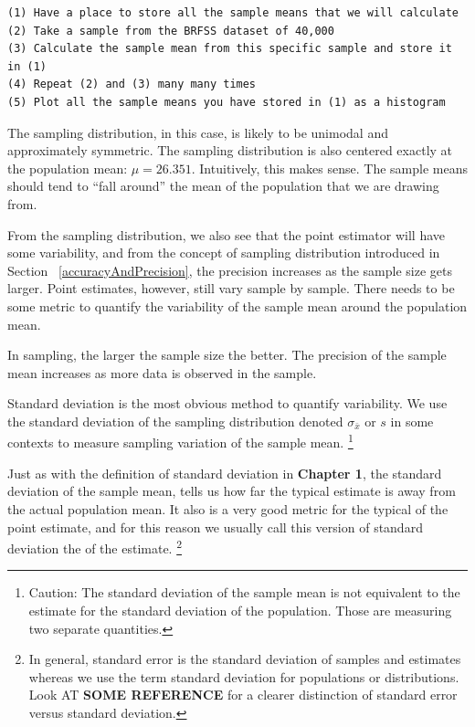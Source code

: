 \begin{verbatim}
(1) Have a place to store all the sample means that we will calculate
(2) Take a sample from the BRFSS dataset of 40,000
(3) Calculate the sample mean from this specific sample and store it in (1)
(4) Repeat (2) and (3) many many times 
(5) Plot all the sample means you have stored in (1) as a histogram
\end{verbatim}
  
The sampling distribution, in this case, is likely to be unimodal and approximately symmetric. The sampling distribution is also centered exactly at the  population mean: $\mu=26.351$. Intuitively, this makes sense. The sample means should tend to ``fall around'' the mean of the population that we are drawing from.

From the sampling distribution, we also see that the point estimator will have some variability, and from the concept of sampling distribution introduced in Section ~\ref{accuracyAndPrecision}, the precision increases as the sample size gets larger. Point estimates, however, still vary sample by sample. There needs to be some metric to quantify the variability of the sample mean around the population mean.

\begin{tipBox}{
In sampling, the larger the sample size the better. The precision of the sample mean increases as more data is observed in the sample.}
\end{tipBox}

Standard deviation is the most obvious method to quantify variability. We use the standard deviation of the sampling distribution denoted  $\sigma_{\bar{x}}$ or $s$ in some contexts to measure sampling variation of the sample mean. \footnote{Caution: The standard deviation of the sample mean is not equivalent to the estimate for the standard deviation of the population. Those are measuring two separate quantities.}

Just as with the definition of standard deviation in \textbf{Chapter 1}, the standard deviation of the sample mean, tells us how far the typical estimate is away from the actual population mean. It also is a very good metric for the typical  of the point estimate, and for this reason we usually call this version of standard deviation the   of the estimate. \footnote{In general, standard error is the standard deviation of samples and estimates whereas we use the term standard deviation for populations or distributions. Look AT \textbf{SOME REFERENCE} for a clearer distinction of standard error versus standard deviation.} 

